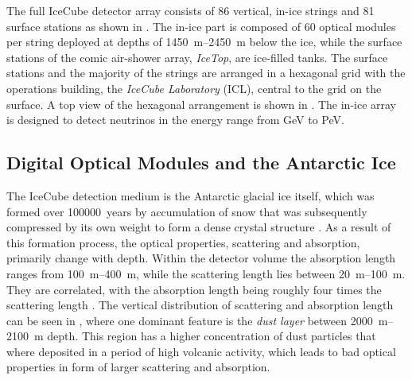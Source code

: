 The full IceCube detector array consists of 86 vertical, in-ice strings and 81 surface stations as shown in . The in-ice part is composed of 60 optical modules per string deployed at depths of \SIrange[range-phrase=-]{1450}{2450}{\metre} below the ice, while the surface stations of the comic air-shower array, \textit{IceTop}, are ice-filled tanks. The surface stations and the majority of the strings are arranged in a hexagonal grid with the operations building, the \textit{IceCube Laboratory} (ICL), central to the grid on the surface. A top view of the hexagonal arrangement is shown in . The in-ice array is designed to detect neutrinos in the energy range from \si{\giga\electronvolt} to \si{\peta\electronvolt}.


\subsection{Digital Optical Modules and the Antarctic Ice} 

The IceCube detection medium is the Antarctic glacial ice itself, which was formed over \SI{100000}{years} by accumulation of snow that was subsequently compressed by its own weight to form a dense crystal structure . As a result of this formation process, the optical properties, scattering and absorption, primarily change with depth. Within the detector volume the absorption length ranges from \SIrange[range-phrase=-]{100}{400}{\metre}, while the scattering length lies between \SIrange[range-phrase={~and~}]{20}{100}{\metre}. They are correlated, with the absorption length being roughly four times the scattering length . The vertical distribution of scattering and absorption length can be seen in , where one dominant feature is the \textit{dust layer} between \SIrange[range-phrase={~and~}]{2000}{2100}{\metre} depth. This region has a higher concentration of dust particles that where deposited in a period of high volcanic activity, which leads to bad optical properties in form of larger scattering and absorption.

